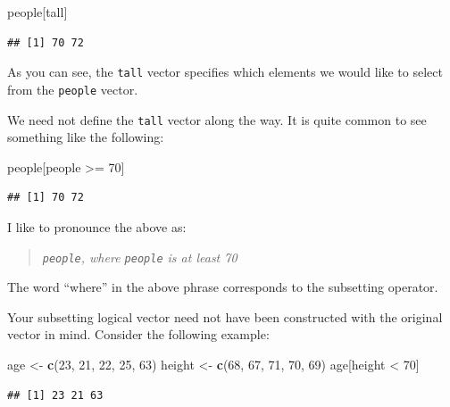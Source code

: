 \documentclass[]{book}
\makeatletter
\newenvironment{Shaded}{\begin{snugshade}}{\end{snugshade}}
\newcommand{\KeywordTok}[1]{\textcolor[rgb]{0.13,0.29,0.53}{\textbf{{#1}}}}
\newcommand{\DecValTok}[1]{\textcolor[rgb]{0.00,0.00,0.81}{{#1}}}
\newcommand{\StringTok}[1]{\textcolor[rgb]{0.31,0.60,0.02}{{#1}}}
\newcommand{\NormalTok}[1]{{#1}}
\newenvironment{kframe}{%
\medskip{}
\setlength{\fboxsep}{.8em}
 \def\at@end@of@kframe{}%
 \ifinner\ifhmode%
  \def\at@end@of@kframe{\end{minipage}}%
  \begin{minipage}{\columnwidth}%
 \fi\fi%
 \def\FrameCommand##1{\hskip\@totalleftmargin \hskip-\fboxsep
 \colorbox{shadecolor}{##1}\hskip-\fboxsep
     \hskip-\linewidth \hskip-\@totalleftmargin \hskip\columnwidth}%
 \MakeFramed {\advance\hsize-\width
   \@totalleftmargin\z@ \linewidth\hsize
   \@setminipage}}%
 {\par\unskip\endMakeFramed%
 \at@end@of@kframe}
\renewenvironment{Shaded}{\begin{kframe}}{\end{kframe}}
\theoremstyle{definition}
\theoremstyle{definition}
\theoremstyle{remark}
\makeatother
\begin{document}
\begin{Shaded}
\begin{Highlighting}[]
\NormalTok{people[tall]}
\end{Highlighting}
\end{Shaded}

\begin{verbatim}
## [1] 70 72
\end{verbatim}

As you can see, the \texttt{tall} vector specifies which elements we
would like to select from the \texttt{people} vector.

We need not define the \texttt{tall} vector along the way. It is quite
common to see something like the following:

\begin{Shaded}
\begin{Highlighting}[]
\NormalTok{people[people >=}\StringTok{ }\DecValTok{70}\NormalTok{]}
\end{Highlighting}
\end{Shaded}

\begin{verbatim}
## [1] 70 72
\end{verbatim}

I like to pronounce the above as:

\begin{quote}
\emph{\texttt{people}, where \texttt{people} is at least 70}
\end{quote}

The word ``where'' in the above phrase corresponds to the subsetting
operator.

Your subsetting logical vector need not have been constructed with the
original vector in mind. Consider the following example:

\begin{Shaded}
\begin{Highlighting}[]
\NormalTok{age <-}\StringTok{ }\KeywordTok{c}\NormalTok{(}\DecValTok{23}\NormalTok{, }\DecValTok{21}\NormalTok{, }\DecValTok{22}\NormalTok{, }\DecValTok{25}\NormalTok{, }\DecValTok{63}\NormalTok{)}
\NormalTok{height <-}\StringTok{ }\KeywordTok{c}\NormalTok{(}\DecValTok{68}\NormalTok{, }\DecValTok{67}\NormalTok{, }\DecValTok{71}\NormalTok{, }\DecValTok{70}\NormalTok{, }\DecValTok{69}\NormalTok{)}
\NormalTok{age[height <}\StringTok{ }\DecValTok{70}\NormalTok{]}
\end{Highlighting}
\end{Shaded}

\begin{verbatim}
## [1] 23 21 63
\end{verbatim}
\end{document}

